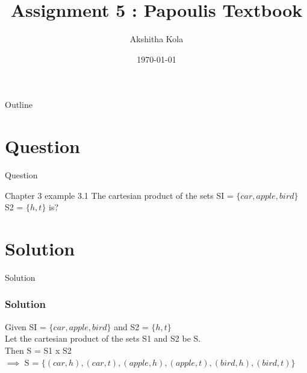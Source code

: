 \documentclass{beamer}
\title{Assignment 5 : Papoulis Textbook }
\author{Akshitha Kola}
\date{\today}
\begin{document}
\begin{frame}
    \titlepage 
\end{frame}

\logo{}

\begin{frame}{Outline}
    \tableofcontents
\end{frame}

\section{Question}
\begin{frame}{Question}
    \begin{block}{Chapter 3 example 3.1}
    The cartesian product of the sets SI = $\{car, apple, bird\}$ S2 = $\{h, t\}$ is?
    \end{block}
\end{frame}

\section{Solution}
\begin{frame}{Solution}
\frametitle{Solution}
Given SI = $\{car, apple, bird\}$ and S2 = $\{h, t\}$ \\
Let the cartesian product of the sets S1 and S2 be S.\\
Then S = S1 x S2 \\
$\implies$ S = $\{(car,h),(car,t),(apple,h),(apple,t),(bird,h),(bird,t)\}$
\end{frame}
\end{document}
